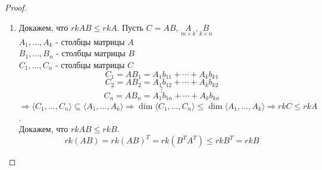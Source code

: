 \documentclass[a4paper, 12pt]{article}
\theoremstyle{definition}
\begin{document}
\begin{proof}
\begin{enumerate}
      \item Докажем, что $rkAB \leq rkA$. Пусть $C =AB$, $\underset{m \times k}{A}, \underset{k \times n}{B}$ \\
      $A_1,...,A_k$ - столбцы матрицы $A$ \\
      $B_1,...,B_n$ - столбцы матрицы $B$ \\
      $C_1,...,C_n$ - столбцы матрицы $C$
      $$C_1 = AB_1 = A_1b_{11} + \cdots + A_kb_{k1}$$ 
      $$C_2 = AB_2 = A_1b_{12} + \cdots + A_kb_{k2}$$
      $$\vdots$$
      $$C_n = AB_n = A_1b_{1n} + \cdots + A_kb_{kn}$$
      $\Longrightarrow \langle C_1,...,C_n \rangle \subseteq \langle A_1,...,A_k \rangle \Longrightarrow \dim\langle C_1,...,C_n \rangle \leq \dim\langle A_1,...,A_k \rangle \Longrightarrow rkC\leq rkA$. \\
      Докажем, что $rkAB \leq rkB$.
      $$rk(AB) = rk(AB)^T = rk(B^TA^T) \leq rkB^T = rkB$$ 
    \end{enumerate}
  \end{proof}

  \newpage
  
\end{document}
